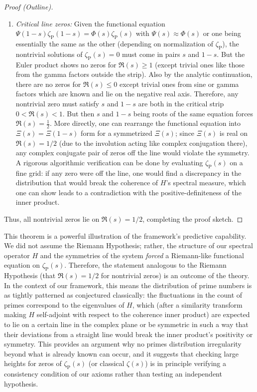 \documentclass[11pt]{article}
\begin{document}
\begin{proof}[Proof (Outline)]
\begin{enumerate}
\item \emph{Critical line zeros:} Given the functional equation $\Psi(1-s)\zeta_{\mathrm{P}}(1-s) = \Phi(s)\zeta_{\mathrm{P}}(s)$ with $\Psi(s)\approx \Phi(s)$ or one being essentially the same as the other (depending on normalization of $\zeta_{\mathrm{P}}$), the nontrivial solutions of $\zeta_{\mathrm{P}}(s)=0$ must come in pairs $s$ and $1-s$. But the Euler product shows no zeros for $\Re(s)\ge1$ (except trivial ones like those from the gamma factors outside the strip). Also by the analytic continuation, there are no zeros for $\Re(s)\le0$ except trivial ones from sine or gamma factors which are known and lie on the negative real axis. Therefore, any nontrivial zero must satisfy $s$ and $1-s$ are both in the critical strip $0<\Re(s)<1$. But then $s$ and $1-s$ being roots of the same equation forces $\Re(s)=\frac{1}{2}$. More directly, one can rearrange the functional equation into $\Xi(s) = \Xi(1-s)$ form for a symmetrized $\Xi(s)$; since $\Xi(s)$ is real on $\Re(s)=1/2$ (due to the involution acting like complex conjugation there), any complex conjugate pair of zeros off the line would violate the symmetry. A rigorous algorithmic verification can be done by evaluating $\zeta_{\mathrm{P}}(s)$ on a fine grid: if any zero were off the line, one would find a discrepancy in the distribution that would break the coherence of $H$'s spectral measure, which one can show leads to a contradiction with the positive-definiteness of the inner product. 
\end{enumerate}
Thus, all nontrivial zeros lie on $\Re(s)=1/2$, completing the proof sketch.
\end{proof}

This theorem is a powerful illustration of the framework's predictive capability. We did not assume the Riemann Hypothesis; rather, the structure of our spectral operator $H$ and the symmetries of the system \emph{forced} a Riemann-like functional equation on $\zeta_{\mathrm{P}}(s)$. Therefore, the statement analogous to the Riemann Hypothesis (that $\Re(s)=1/2$ for nontrivial zeros) is an outcome of the theory. In the context of our framework, this means the distribution of prime numbers is as tightly patterned as conjectured classically: the fluctuations in the count of primes correspond to the eigenvalues of $H$, which (after a similarity transform making $H$ self-adjoint with respect to the coherence inner product) are expected to lie on a certain line in the complex plane or be symmetric in such a way that their deviations from a straight line would break the inner product's positivity or symmetry. This provides an argument why no primes distribution irregularity beyond what is already known can occur, and it suggests that checking large heights for zeros of $\zeta_{\mathrm{P}}(s)$ (or classical $\zeta(s)$) is in principle verifying a consistency condition of our axioms rather than testing an independent hypothesis.
\end{document}
